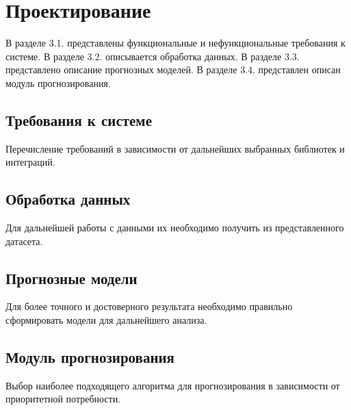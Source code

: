 \lstset{language=C, frame=L, basicstyle=\footnotesize,%
	keywordstyle=\bfseries, showstringspaces=false, xleftmargin=\parindent, numbers=none, numberstyle=\tiny, stepnumber=2, numbersep=12pt}
\newpage
\section{Проектирование}
\label{sec:Design}

В разделе 3.1. представлены функциональные и нефункциональные требования к системе. В разделе 3.2. описывается обработка данных. В разделе 3.3. представлено описание прогнозных моделей. В разделе 3.4. представлен описан модуль прогнозирования.

\subsection{Требования к системе}

Перечисление требований в зависимости от дальнейших выбранных библиотек и интеграций.

\subsection{Обработка данных}

Для дальнейшей работы с данными их необходимо получить из представленного датасета.

\subsection{Прогнозные модели}

Для более точного и достоверного результата необходимо правильно сформировать модели для дальнейшего анализа.

\subsection{Модуль прогнозирования}

Выбор наиболее подходящего алгоритма для прогнозирования в зависимости от приоритетной потребности.
